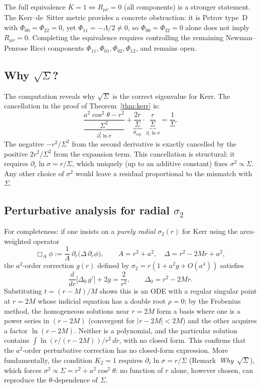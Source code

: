 \documentclass[11pt,a4paper]{article}
\begin{document}
The full equivalence $K{=}1\Leftrightarrow R_{\mu\nu}=0$
(all components) is a stronger statement.
The Kerr--de~Sitter metric provides a concrete obstruction:
it is Petrov type~D with $\Phi_{00}=\Phi_{22}=0$, yet
$\Phi_{11}=-\Lambda/2\neq 0$, so $\Phi_{00}=\Phi_{22}=0$
alone does not imply $R_{\mu\nu}=0$.
Completing the equivalence requires controlling the
remaining Newman--Penrose Ricci components
$\Phi_{11},\Phi_{01},\Phi_{02},\Phi_{12}$, and remains open.

\subsection*{Why $\sqrt{\Sigma}$?}

The computation reveals why $\sqrt{\Sigma}$ is the correct
eigenvalue for Kerr.
The cancellation in the proof of Theorem~\ref{thm:kerr} is:
\[
  \underbrace{\frac{a^2\cos^2\!\theta-r^2}{\Sigma^2}}_{\partial_r^2\ln\sigma}
  +\underbrace{\frac{2r}{\Sigma}}_{\theta_{\mathrm{exp}}}
  \cdot\underbrace{\frac{r}{\Sigma}}_{\partial_r\ln\sigma}
  =\frac{1}{\Sigma}.
\]
The negative $-r^2/\Sigma^2$ from the second derivative is
exactly cancelled by the positive $2r^2/\Sigma^2$ from the
expansion term.
This cancellation is structural: it requires
$\partial_r\ln\sigma=r/\Sigma$, which uniquely (up to an
additive constant) fixes $\sigma^2\propto\Sigma$.
Any other choice of $\sigma^2$ would leave a residual
proportional to the mismatch with $\Sigma$.

\subsection*{Perturbative analysis for radial $\sigma_2$}

For completeness: if one insists on a
\emph{purely radial} $\sigma_2(r)$ for Kerr using the area-weighted
operator
\begin{equation}\label{eq:boxA}
  \Box_A\phi := \frac{1}{A}\,\partial_r\!\bigl(\Delta\,\partial_r\phi\bigr),
  \qquad A=r^2+a^2,\quad \Delta=r^2-2Mr+a^2,
\end{equation}
the $a^2$-order correction $g(r)$ defined by
$\sigma_2=r(1+a^2 g+O(a^4))$ satisfies
\begin{equation}
  \frac{d}{dr}\!\bigl[\Delta_0\,g'\bigr]+2g=\frac{2}{r^2},
  \qquad \Delta_0=r^2-2Mr.
\end{equation}
Substituting $t=(r-M)/M$ shows this is an ODE with a
regular singular point at $r=2M$ whose indicial equation
has a double root $\rho=0$; by the Frobenius method, the
homogeneous solutions near $r=2M$ form a basis where one is
a power series in $(r-2M)$ (convergent for $|r-2M|<2M$) and
the other acquires a factor $\ln(r-2M)$.
Neither is a polynomial, and the particular solution contains
$\int\!\ln(r/(r{-}2M))/r^2\,dr$, with no closed form.
This confirms that the $a^2$-order perturbative correction
has no closed-form expression.
More fundamentally, the condition $K_2{=}1$ requires
$\partial_r\ln\sigma = r/\Sigma$ (Remark~\textit{Why~$\sqrt{\Sigma}$}),
which forces $\sigma^2\propto\Sigma=r^2+a^2\cos^2\!\theta$:
no function of $r$ alone, however chosen, can reproduce the
$\theta$-dependence of $\Sigma$.
\end{document}
